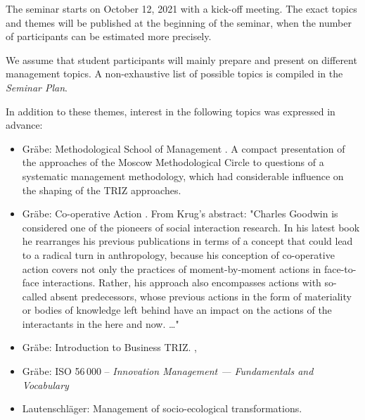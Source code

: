 \documentclass[11pt,a4paper]{article}
\begin{document}
The seminar starts on October 12, 2021 with a kick-off meeting.  The exact
topics and themes will be published at the beginning of the seminar, when the
number of participants can be estimated more precisely.

We assume that student participants will mainly prepare and present on
different management topics. A non-exhaustive list of possible topics is
compiled in the \emph{Seminar Plan}.

In addition to these themes, interest in the following topics was expressed in
advance:
\begin{itemize}
\item Gr\"abe: Methodological School of Management \cite{Khristenko2014,
  Shchedrovitsky1981}.  A compact presentation of the approaches of the Moscow
  Methodological Circle to questions of a systematic management methodology,
  which had considerable influence on the shaping of the TRIZ approaches.
\item Gr\"abe: Co-operative Action \cite{Goodwin2018, Krug2019}. From Krug's
  abstract: "Charles Goodwin is considered one of the pioneers of social
  interaction research. In his latest book he rearranges his previous
  publications in terms of a concept that could lead to a radical turn in
  anthropology, because his conception of co-operative action covers not only
  the practices of moment-by-moment actions in face-to-face interactions.
  Rather, his approach also encompasses actions with so-called absent
  predecessors, whose previous actions in the form of materiality or bodies of
  knowledge left behind have an impact on the actions of the interactants in
  the here and now. \ldots"
\item Gr\"abe: Introduction to Business TRIZ. \cite{Souchkov2010},
  \cite{Souchkov2014}
\item Gr\"abe: ISO 56\,000 -- \emph{Innovation Management — Fundamentals and
  Vocabulary}
\item Lautenschläger: Management of socio-ecological transformations. 
\end{itemize}
\end{document}
